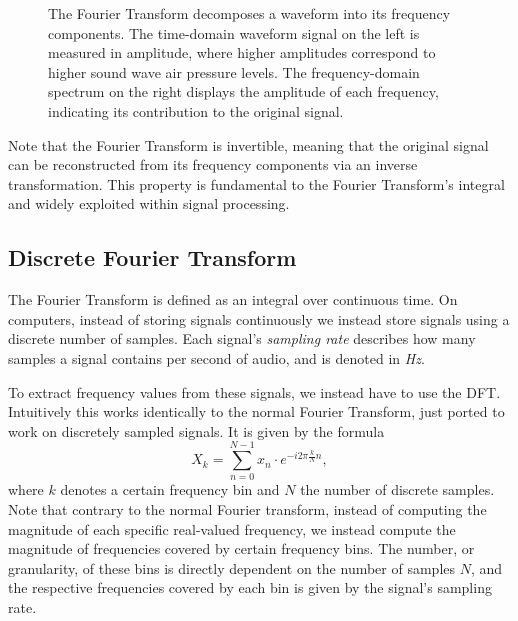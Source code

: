\begin{figure}[H]
    \centering
    \hspace*{-1.3cm}
    \caption{The Fourier Transform decomposes a waveform into its frequency components. The time-domain waveform signal on the left is measured in amplitude, where higher amplitudes correspond to higher sound wave air pressure levels. The frequency-domain spectrum on the right displays the amplitude of each frequency, indicating its contribution to the original signal.}
    \label{FTFigure}
\end{figure}

Note that the Fourier Transform is invertible, meaning that the original signal can be reconstructed from its frequency components via an inverse transformation. This property is fundamental to the Fourier Transform's integral and widely exploited within signal processing.

\subsection{Discrete Fourier Transform}

The Fourier Transform is defined as an integral over continuous time. On computers, instead of storing signals continuously we instead store signals using a discrete number of samples. Each signal's \textit{sampling rate} describes how many samples a signal contains per second of audio, and is denoted in \textit{Hz}.

To extract frequency values from these signals, we instead have to use the \gls{DFT}. Intuitively this works identically to the normal Fourier Transform, just ported to work on discretely sampled signals. It is given by the formula \[ X_k = \sum^{N - 1}_{n=0}{x_n \cdot e^{-i 2\pi \frac{k}{N} n}}, \] where $k$ denotes a certain frequency bin and $N$ the number of discrete samples. Note that contrary to the normal Fourier transform, instead of computing the magnitude of each specific real-valued frequency, we instead compute the magnitude of frequencies covered by certain frequency bins. The number, or granularity, of these bins is directly dependent on the number of samples $N$, and the respective frequencies covered by each bin is given by the signal's sampling rate.

